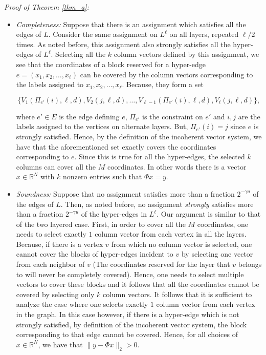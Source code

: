 \documentclass[11pt]{article}
\begin{document}
\emph{Proof of Theorem \ref{thm_a}:}
\begin{itemize}
\item \textit{Completeness:} Suppose that there is an assignment
which satisfies all the edges of $L$. Consider the same
assignment on $L^{\ell}$ on all layers, repeated $\ell/2$ times.
As noted before, this assignment also strongly satisfies all the
hyper-edges of $L^{\ell}$. Selecting all the $k$ column vectors
defined by this assignment, we see that the coordinates of a block
reserved for a hyper-edge  $e=(x_1,x_2,\hdots,x_{\ell})$ can be
covered by the column vectors corresponding to the labels assigned
to $x_1,x_2,\hdots,x_{\ell}$. Because, they form a set

$$
\{V_1(\Pi_{e'}(i),\ell,d), V_2(j,\ell,d), \hdots, V_{\ell-1}(\Pi_{e'}(i),
\ell,d), V_{\ell}(j,\ell,d)\},
$$

\noindent where $e' \in E$ is the edge
defining $e$, $\Pi_{e'}$ is the constraint on $e'$ and $i,j$ are
the labels assigned to the vertices on alternate layers. But,
$\Pi_{e'}(i)=j$ since $e$ is strongly satisfied. Hence, by the
definition of the incoherent vector system, we have that the
aforementioned set exactly covers the coordinates corresponding
to $e$. Since this is true for all the hyper-edges, the selected $k$ columns
can cover all the $M$ coordinates. In other words there is a
vector $x \in \mathbb{R}^{N}$ with $k$ nonzero entries such
that $\Phi x = y$.


\item \textit{Soundness:} Suppose that no assignment satisfies
more than a fraction $2^{-\gamma u}$ of the edges of $L$. Then,
as noted before, no assignment \emph{strongly} satisfies more
than a fraction $2^{-\gamma u}$ of the hyper-edges in $L^{\ell}$.
Our argument is similar to that of the two layered case. First,
in order to cover all the $M$ coordinates, one needs to select
exactly $1$ column vector from each vertex in all the layers.
Because, if there is a vertex $v$ from which no column vector
is selected, one cannot cover the blocks of hyper-edges incident
to $v$ by selecting one vector from each neighbor of $v$ (The
coordinates reserved for the layer that $v$ belongs to will never
be completely covered). Hence, one needs to select multiple
vectors to cover these blocks and it follows that all the
coordinates cannot be covered by selecting only $k$ column vectors.
It follows that it is sufficient to analyze the case where one
selects exactly $1$ column vector from each vertex in the graph.
In this case however, if there is a hyper-edge which is not strongly
satisfied, by definition of the incoherent vector system, the
block corresponding to that edge cannot be covered. Hence, for
all choices of $x \in \mathbb{R}^N$, we have that
$\|y - \Phi x\|_2 > 0$.
\end{itemize}
\end{document}
